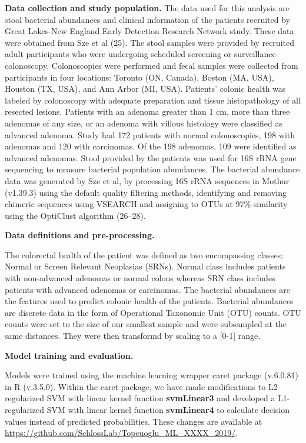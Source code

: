 \documentclass[11pt,]{article}
\begin{document}
\textbf{Data collection and study population.} The data used for this
analysis are stool bacterial abundances and clinical information of the
patients recruited by Great Lakes-New England Early Detection Research
Network study. These data were obtained from Sze et al (25). The stool
samples were provided by recruited adult participants who were
undergoing scheduled screening or surveillance colonoscopy.
Colonoscopies were performed and fecal samples were collected from
participants in four locations: Toronto (ON, Canada), Boston (MA, USA),
Houston (TX, USA), and Ann Arbor (MI, USA). Patients' colonic health was
labeled by colonoscopy with adequate preparation and tissue
histopathology of all resected lesions. Patients with an adenoma greater
than 1 cm, more than three adenomas of any size, or an adenoma with
villous histology were classified as advanced adenoma. Study had 172
patients with normal colonoscopies, 198 with adenomas and 120 with
carcinomas. Of the 198 adenomas, 109 were identified as advanced
adenomas. Stool provided by the patients was used for 16S rRNA gene
sequencing to measure bacterial population abundances. The bacterial
abundance data was generated by Sze et al, by processing 16S rRNA
sequences in Mothur (v1.39.3) using the default quality filtering
methods, identifying and removing chimeric sequences using VSEARCH and
assigning to OTUs at 97\% similarity using the OptiClust algorithm
(26--28).

\textbf{Data definitions and pre-processing.}

The colorectal health of the patient was defined as two encompassing
classes; Normal or Screen Relevant Neoplasias (SRNs). Normal class
includes patients with non-advanced adenomas or normal colons whereas
SRN class includes patients with advanced adenomas or carcinomas. The
bacterial abundances are the features used to predict colonic health of
the patients. Bacterial abundances are discrete data in the form of
Operational Taxonomic Unit (OTU) counts. OTU counts were set to the size
of our smallest sample and were subsampled at the same distances. They
were then transformd by scaling to a {[}0-1{]} range.

\textbf{Model training and evaluation.}

Models were trained using the machine learning wrapper caret package
(v.6.0.81) in R (v.3.5.0). Within the caret package, we have made
modifications to L2-regularized SVM with linear kernel function
\textbf{svmLinear3} and developed a L1-regularized SVM with linear
kernel function \textbf{svmLinear4} to calculate decision values instead
of predicted probabilities. These changes are available at
\url{https://github.com/SchlossLab/Topcuoglu_ML_XXXX_2019/}.
\end{document}
